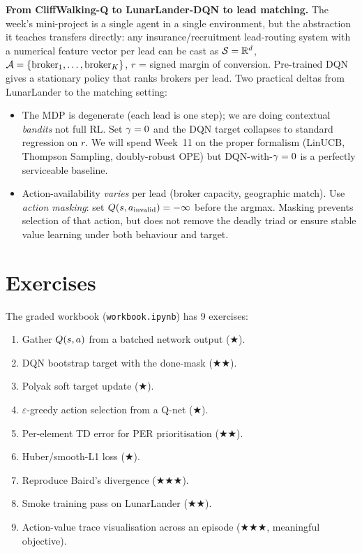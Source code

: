 \documentclass[11pt,oneside]{scrbook}
\begin{document}
\begin{matching}
\textbf{From CliffWalking-Q to LunarLander-DQN to lead matching.}
The week's mini-project is a single agent in a single environment, but the abstraction it
teaches transfers directly: any insurance/recruitment lead-routing system with a numerical
feature vector per lead can be cast as $\mathcal{S} = \mathbb{R}^d$, $\mathcal{A} = \{\text{broker}_1,
\ldots, \text{broker}_K\}$, $r$ = signed margin of conversion. Pre-trained DQN gives a
stationary policy that ranks brokers per lead. Two practical deltas from LunarLander to
the matching setting:
\begin{itemize}
  \item The MDP is degenerate (each lead is one step); we are doing contextual
    \emph{bandits} not full RL. Set $\gamma = 0$ and the DQN target collapses to standard
    regression on $r$. We will spend Week~11 on the proper formalism (LinUCB, Thompson
    Sampling, doubly-robust OPE) but DQN-with-$\gamma=0$ is a perfectly serviceable
    baseline.
  \item Action-availability \emph{varies} per lead (broker capacity, geographic match).
    Use \emph{action masking}: set $Q(s, a_\text{invalid}) = -\infty$ before the
    argmax. Masking prevents selection of that action, but does not remove the deadly triad or ensure stable value learning
    under both behaviour and target.
\end{itemize}
\end{matching}

\chapter{Exercises}

The graded workbook (\texttt{workbook.ipynb}) has 9 exercises:

\begin{enumerate}
  \item Gather $Q(s,a)$ from a batched network output ($\bigstar$).
  \item DQN bootstrap target with the done-mask ($\bigstar\bigstar$).
  \item Polyak soft target update ($\bigstar$).
  \item $\varepsilon$-greedy action selection from a Q-net ($\bigstar$).
  \item Per-element TD error for PER prioritisation ($\bigstar\bigstar$).
  \item Huber/smooth-L1 loss ($\bigstar$).
  \item Reproduce Baird's divergence ($\bigstar\bigstar\bigstar$).
  \item Smoke training pass on LunarLander ($\bigstar\bigstar$).
  \item Action-value trace visualisation across an episode ($\bigstar\bigstar\bigstar$, meaningful objective).
\end{enumerate}
\end{document}
